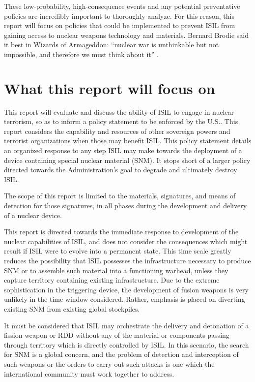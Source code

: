 \documentclass{report}
\begin{document}
These low-probability, high-consequence events and any potential preventative policies are incredibly important to thoroughly analyze. For this reason, this report will focus on policies that could be implemented to prevent ISIL from gaining access to nuclear weapons technology and materials. Bernard Brodie said it best in Wizards of Armageddon: \enquote{nuclear war is unthinkable but not impossible, and therefore we must think about it} \cite{kaplan1991wizards}.





\section{What this report will focus on}

This  report will evaluate and discuss the ability of  ISIL to engage in nuclear terrorism, so as to inform a policy statement to be enforced by the U.S.. This report considers the capability and resources of other sovereign powers and terrorist organizations when those may benefit ISIL. This policy statement details an organized response to any step ISIL may make towards the deployment of a device containing special nuclear material (SNM). It stops short of a larger policy directed towards  the Administration's goal to degrade and ultimately destroy ISIL. 

The scope of this  report is limited to the materials, signatures, and means of detection for those signatures, in all phases during the development and delivery of a nuclear device. 

This  report is directed towards the immediate response to development of the nuclear capabilities of ISIL, and does not consider the consequences which might result if ISIL were to evolve into a permanent state. This  time scale greatly reduces the possibility that ISIL possesses the infrastructure necessary to produce SNM or to assemble such material into a functioning warhead, unless they capture territory containing existing infrastructure. Due to the extreme sophistication in the triggering device, the development of fusion weapons is very unlikely in the time window considered. Rather, emphasis is placed on diverting existing SNM from existing global stockpiles.

It must be considered that ISIL may orchestrate the delivery and detonation of a fission weapon or RDD without any of the material or components passing through territory which is directly controlled by ISIL. In this scenario, the search for SNM is a global concern, and the problem of detection and interception of such weapons or the orders to carry out such attacks is one which the international community must work together to address. 
\end{document}
